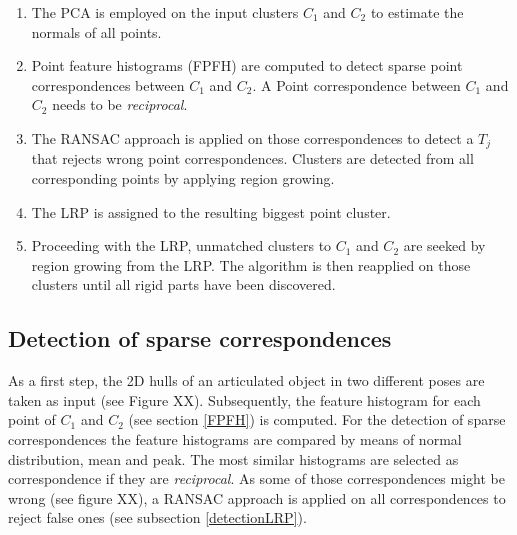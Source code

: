\begin{enumerate}
	\item The PCA is employed on the input clusters $C_1$ and $C_2$ to estimate the normals of all points.
	\item Point feature histograms (FPFH) are computed to detect sparse point correspondences between $C_1$ and $C_2$. A Point correspondence between $C_1$ and $C_2$ needs to be \textit{reciprocal}.
	\item The RANSAC approach is applied on those correspondences to detect a $T_j$ that rejects wrong point correspondences. Clusters are detected from all corresponding points by applying region growing.
	\item The LRP is assigned to the resulting biggest point cluster.
	\item Proceeding with the LRP, unmatched clusters to $C_1$ and $C_2$ are seeked by region growing from the LRP. The algorithm is then reapplied on those clusters until all rigid parts have been discovered.
\end{enumerate}

\subsection{Detection of sparse correspondences}
\label{correspondences}

As a first step, the 2D hulls of an articulated object in two different poses are taken as input (see Figure XX). Subsequently, the feature histogram for each point of $C_1$ and $C_2$ (see section \ref{FPFH}) is computed. For the detection of sparse correspondences the feature histograms are compared by means of normal distribution, mean and peak. The most similar histograms are selected as correspondence if they are \textit{reciprocal}.
As some of those correspondences might be wrong (see figure XX), a RANSAC approach is applied on all correspondences to reject false ones (see subsection \ref{detectionLRP}).



